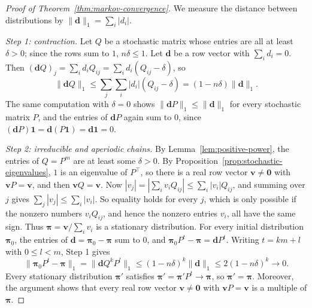 \documentclass[11pt]{article}
\newcommand{\norm}[1]{\lVert #1 \rVert}
\theoremstyle{definition}
\theoremstyle{plain}
\theoremstyle{remark}
\begin{document}
\begin{proof}[Proof of Theorem~\ref{thm:markov-convergence}]
    We measure the distance between distributions by $\norm{\mathbf{d}}_1 = \sum_i |d_i|$.

    \emph{Step 1: contraction.} Let $Q$ be a stochastic matrix whose entries are all at least $\delta > 0$; since the rows sum to $1$, $n\delta \leq 1$. Let $\mathbf{d}$ be a row vector with $\sum_i d_i = 0$. Then $(\mathbf{d}Q)_j = \sum_i d_iQ_{ij} = \sum_i d_i(Q_{ij} - \delta)$, so
    \[\norm{\mathbf{d}Q}_1 \leq \sum_j \sum_i |d_i|(Q_{ij} - \delta) = (1 - n\delta)\norm{\mathbf{d}}_1.\]
    The same computation with $\delta = 0$ shows $\norm{\mathbf{d}P}_1 \leq \norm{\mathbf{d}}_1$ for every stochastic matrix $P$, and the entries of $\mathbf{d}P$ again sum to $0$, since $(\mathbf{d}P)\mathbf{1} = \mathbf{d}(P\mathbf{1}) = \mathbf{d}\mathbf{1} = 0$.

    \emph{Step 2: irreducible and aperiodic chains.} By Lemma~\ref{lem:positive-power}, the entries of $Q = P^m$ are at least some $\delta > 0$. By Proposition~\ref{prop:stochastic-eigenvalues}, $1$ is an eigenvalue of $P^\top$, so there is a real row vector $\mathbf{v} \neq \mathbf{0}$ with $\mathbf{v}P = \mathbf{v}$, and then $\mathbf{v}Q = \mathbf{v}$. Now $|v_j| = |\sum_i v_iQ_{ij}| \leq \sum_i |v_i|Q_{ij}$, and summing over $j$ gives $\sum_j |v_j| \leq \sum_i |v_i|$. So equality holds for every $j$, which is only possible if the nonzero numbers $v_iQ_{ij}$, and hence the nonzero entries $v_i$, all have the same sign. Thus $\boldsymbol{\pi} = \mathbf{v}/\sum_i v_i$ is a stationary distribution. For every initial distribution $\boldsymbol{\pi}_0$, the entries of $\mathbf{d} = \boldsymbol{\pi}_0 - \boldsymbol{\pi}$ sum to $0$, and $\boldsymbol{\pi}_0P^t - \boldsymbol{\pi} = \mathbf{d}P^t$. Writing $t = km + l$ with $0 \leq l < m$, Step 1 gives
    \[\norm{\boldsymbol{\pi}_0P^t - \boldsymbol{\pi}}_1 = \norm{\mathbf{d}Q^kP^l}_1 \leq (1 - n\delta)^k\norm{\mathbf{d}}_1 \leq 2(1 - n\delta)^k \to 0.\]
    Every stationary distribution $\boldsymbol{\pi}'$ satisfies $\boldsymbol{\pi}' = \boldsymbol{\pi}'P^t \to \boldsymbol{\pi}$, so $\boldsymbol{\pi}' = \boldsymbol{\pi}$. Moreover, the argument shows that every real row vector $\mathbf{v} \neq \mathbf{0}$ with $\mathbf{v}P = \mathbf{v}$ is a multiple of $\boldsymbol{\pi}$.


\end{proof}
\end{document}
